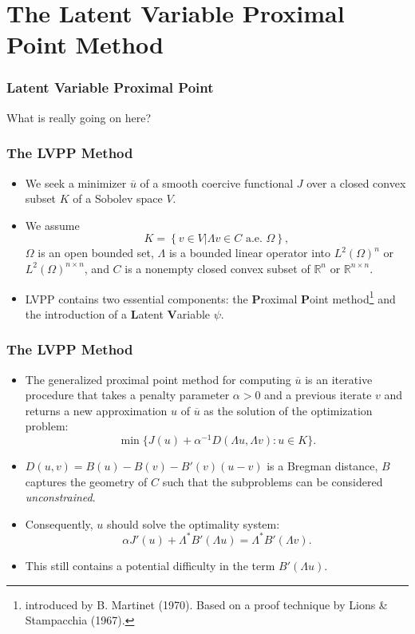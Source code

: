 \documentclass[aspectratio=169,xcolor=dvipsnames,11pt]{beamer}
\begin{document}
\section{The Latent Variable Proximal Point Method}
\begin{frame}\frametitle{Latent Variable Proximal Point}
\begin{center}
{\Large
{\color{Maroon}
What is really going on here? %
}
}
\end{center}
\end{frame}

\begin{frame}\frametitle{The LVPP Method}
\begin{itemize}
\item We seek a minimizer $\overline{u}$ of a smooth coercive functional $J$ over a closed convex subset $K$ of a Sobolev space $V$. \pause
\item  We assume 
\[
K = \left\{v \in V \left| \Lambda v \in C \text{ a.e. } \Omega \right.\right\},
\] 
$\Omega$ is an open bounded set, $\Lambda$ is a bounded linear operator into $L^2(\Omega)^n$ or $L^2(\Omega)^{n\times n}$, and $C$ is a nonempty closed convex subset of $\mathbb R^n$ or $\mathbb R^{n \times n}$. \pause
\item  LVPP contains two essential components: the \textbf{P}roximal \textbf{P}oint method\footnote{\tiny introduced by B. Martinet (1970). Based on a proof technique by Lions \& Stampacchia (1967).} and the introduction of a \textbf{L}atent \textbf{V}ariable $\psi$.
\end{itemize}
\end{frame}

\begin{frame}\frametitle{The LVPP Method}
\begin{itemize}
\item The generalized proximal point method for computing $\overline{u}$ is an iterative procedure that takes a penalty parameter $\alpha > 0$ and a previous iterate $v$ and returns a new approximation $u$ of $\overline{u}$  as the solution of the optimization problem: 
\[
\min\{ J(u) + \alpha^{-1} D(\Lambda u,\Lambda v) : u \in K\}.
\] 
\item \pause $D(u,v) = B(u) - B(v) - B'(v)(u - v)$ is a Bregman distance, $B$ captures the geometry of $C$ such that the subproblems can be considered \textit{unconstrained}.
\item \pause Consequently, $u$ should solve the optimality system:
\[
\alpha J'(u) + \Lambda^* B'(\Lambda u) = \Lambda^* B'(\Lambda v).
\]
\item \pause This still contains a potential difficulty in the term $B'(\Lambda u)$.
\end{itemize}
\end{frame}
\end{document}
